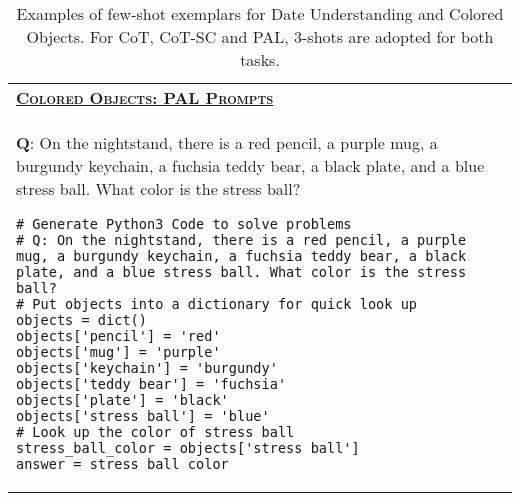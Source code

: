\begin{table}[htbp]
\begin{tabular}{p{}}
\midrule
\underline{\textbf{\textsc{Colored Objects: PAL Prompts}}} \\
 \textbf{Q}: On the nightstand, there is a red pencil, a purple mug, a burgundy keychain, a fuchsia teddy bear, a black plate, and a blue stress ball. What color is the stress ball?
\begin{verbatim}
# Generate Python3 Code to solve problems
# Q: On the nightstand, there is a red pencil, a purple mug, a burgundy keychain, a fuchsia teddy bear, a black plate, and a blue stress ball. What color is the stress ball?
# Put objects into a dictionary for quick look up
objects = dict()
objects['pencil'] = 'red'
objects['mug'] = 'purple'
objects['keychain'] = 'burgundy'
objects['teddy bear'] = 'fuchsia'
objects['plate'] = 'black'
objects['stress ball'] = 'blue'
# Look up the color of stress ball
stress_ball_color = objects['stress ball']
answer = stress_ball_color
\end{verbatim}
        \\
        \bottomrule
    \end{tabular}
          \caption{Examples of few-shot exemplars for Date Understanding and Colored Objects. For CoT, CoT-SC and PAL,
     3-shots are adopted for both tasks.}
    \label{tab:exp-date-colored}
\end{table}